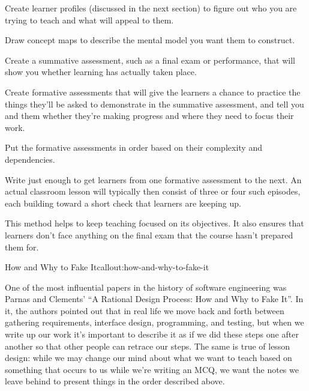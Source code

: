 \begin{genumerate}

\item
  Create learner profiles (discussed in the next section) to figure
  out who you are trying to teach and what will appeal to them.

\item
  Draw concept maps to describe the mental model you want them to
  construct.

\item
  Create a summative assessment, such as a final exam or performance,
  that will show you whether learning has actually taken place.

\item
  Create formative assessments that will give the learners a chance to
  practice the things they'll be asked to demonstrate in the summative
  assessment, and tell you and them whether they're making progress
  and where they need to focus their work.

\item
  Put the formative assessments in order based on their complexity and
  dependencies.

\item
  Write just enough to get learners from one formative assessment to
  the next.  An actual classroom lesson will typically then consist of
  three or four such episodes, each building toward a short check that
  learners are keeping up.

\end{genumerate}

This method helps to keep teaching focused on its objectives. It also
ensures that learners don't face anything on the final exam that the
course hasn't prepared them for.

\begin{callout}{How and Why to Fake It}{callout:how-and-why-to-fake-it}

One of the most influential papers in the history of software
engineering was Parnas and Clements' ``A Rational Design Process: How
and Why to Fake It''.  In it, the authors pointed out that in real
life we move back and forth between gathering requirements, interface
design, programming, and testing, but when we write up our work it's
important to describe it as if we did these steps one after another so
that other people can retrace our steps. The same is true of lesson
design: while we may change our mind about what we want to teach based
on something that occurs to us while we're writing an MCQ, we want the
notes we leave behind to present things in the order described above.

\end{callout}

